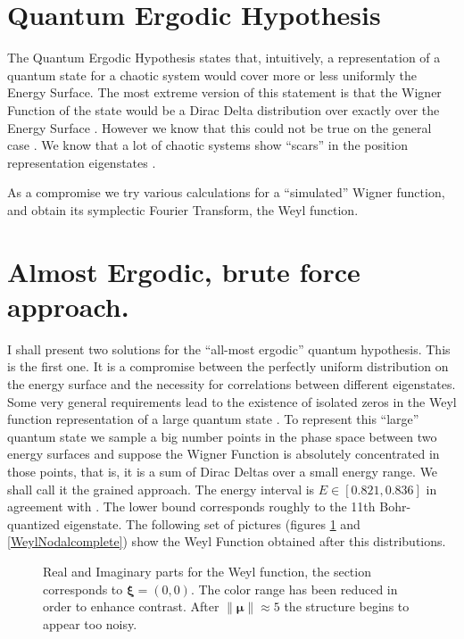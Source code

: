 \documentclass[a4paper,12pt]{article}
\newcommand{\xifase}{ {\boldsymbol{\xi}} }
\newcommand{\mufase}{ {\boldsymbol{\mu}} }
\begin{document}
 
\section{Quantum Ergodic Hypothesis}

The Quantum Ergodic Hypothesis  states that, intuitively, a representation
of a quantum state for a chaotic system would cover more or less uniformly
the Energy Surface. The most extreme version of this statement is
that the Wigner Function of the state would be a Dirac Delta distribution
over exactly over the Energy Surface \cite{BerryRIR}. However we know
that this could not be true on the general case \cite{Ozorio98}. We know
that a lot of chaotic systems show ``scars'' in the position
representation eigenstates \cite{haake}.
 
As a compromise we try various calculations for a ``simulated'' Wigner
function, and obtain its symplectic Fourier Transform, the
Weyl function. 


\section{Almost Ergodic, brute force approach.}

I shall present two solutions for the ``all-most ergodic'' quantum
hypothesis. This is the first one. It is a compromise between the 
perfectly uniform distribution on the energy surface and the
necessity for correlations between different eigenstates. Some very general
requirements lead to the existence of isolated zeros in the
Weyl function representation of a large quantum state \cite{Zambrano09}.
To represent this ``large'' quantum state we sample a big number 
points in the phase
space between two energy surfaces and suppose the Wigner Function
is absolutely concentrated in those points, that is, it is a sum
of Dirac Deltas over a small energy range. We shall call it
the grained approach. The energy interval is
$E\in [0.821,0.836]$ in agreement with \cite{Toscano01}. The lower
bound corresponds roughly to the 11th Bohr-quantized eigenstate. 
The following set of pictures (figures \ref{WeylFunctioncomplete} and 
\ref{WeylNodalcomplete}) show the Weyl Function obtained after this
distributions.


\begin{figure}
\begin{center}
\caption{Real and Imaginary parts for the Weyl function, the section
corresponds to $\xifase=(0,0)$. The color range has been reduced in
order to enhance contrast. After $\|\mufase\|\approx 5$ the structure
begins to appear too noisy.}
\label{WeylFunctioncomplete}
\end{center}
\end{figure}
\end{document}
